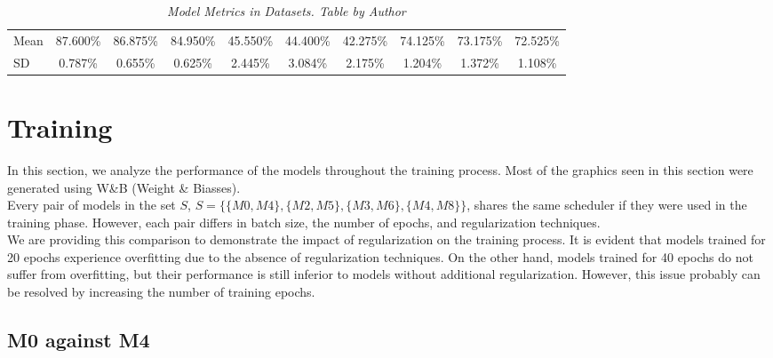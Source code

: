 \begin{landscape}
\begin{table}
\begin{tabular}{lccccccccc}
\midrule

\cellcolor{gray!50}Mean & \cellcolor{gray!50}87.600\% & \cellcolor{gray!50}86.875\% & \cellcolor{gray!50}84.950\% & \cellcolor{gray!50}45.550\% & \cellcolor{gray!50}44.400\% & \cellcolor{gray!50}42.275\% & \cellcolor{gray!50}74.125\% & \cellcolor{gray!50}73.175\% & \cellcolor{gray!50}72.525\% \\
\cellcolor{gray!50}SD & \cellcolor{gray!50}0.787\% & \cellcolor{gray!50}0.655\% & \cellcolor{gray!50}0.625\% & \cellcolor{gray!50}2.445\% & \cellcolor{gray!50}3.084\% & \cellcolor{gray!50}2.175\% & \cellcolor{gray!50}1.204\% & \cellcolor{gray!50}1.372\% &  \cellcolor{gray!50}1.108\% \\

\bottomrule
\end{tabular}
\caption[Model Metrics in Datasets]
  {\textit{Model Metrics in Datasets. Table by Author}}
{\label{table:resume-metrics}}
\end{table}

\end{landscape}


\section{Training}

In this section, we analyze the performance of the models throughout the training process.
Most of the graphics seen in this section were generated using W\&B (Weight \& Biasses).\\


Every pair of models in the set \(S\), \(S=\{\{M0, M4\}, \{M2, M5\}, \{M3, M6\}, \{M4, M8\}\}\),
shares the same scheduler if they were used in the training phase.
However, each pair differs in batch size, the number of epochs, and regularization techniques. \\

We are providing this comparison to demonstrate the impact of regularization on the training process.
It is evident that models trained for 20 epochs experience overfitting due to the absence of regularization techniques. On the other hand,
models trained for 40 epochs do not suffer from overfitting,
but their performance is still inferior to models without additional regularization. However,
this issue probably can be resolved by increasing the number of training epochs.

\subsection{M0 against M4}

